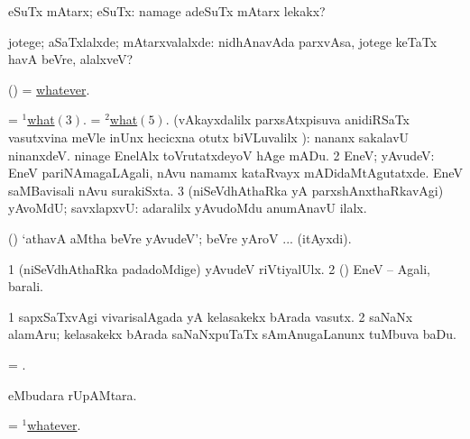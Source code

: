 \bentry
{} 
\gl{\kirxvi}
\expl{}
\bmng
eSuTx mAtarx; eSuTx:  namage adeSuTx mAtarx lekakx? 
\emng

\noindent 
\gl{\pagu}
\expl{}
\bmng
{} jotege; aSaTxlalxde; mAtarxvalalxde:  nidhAnavAda parxvAsa, jotege keTaTx havA beVre, alalxveV? 
\emng
\eentry

\bentry
{} 
\expl{}
\bmng
(\kAparx) = \hyperlink{whatever(1)}{whatever}. 
\emng
\eentry

\bentry
{} 
\expl{}
\bmng
\bnum
{} 
\banum
{} = \hyperlink{what(1)3}{$^1$what\((3)\)}. 
 = \hyperlink{what(2)5}{$^2$what\((5)\)}. (vAkayxdalilx parxsAtxpisuva anidiRSaTx vasutxvina meVle inUnx hecicxna otutx biVLuvalilx \parx):  nananx sakalavU ninanxdeV.  ninage EnelAlx toVrutatxdeyoV hAge mADu. 
\eanum
\numie
\num{2} EneV; yAvudeV:  EneV pariNAmagaLAgali, nAvu namamx kataRvayx mADidaMtAgutatxde.  EneV saMBavisali nAvu surakiSxta. 
\num{3} (niSeVdhAthaRka yA parxshAnxthaRkavAgi) yAvoMdU; savxlapxvU:  adaralilx yAvudoMdu anumAnavU ilalx. 
\enum
\emng

\noindent 
\gl{\pagu}
\expl{}
\bmng
{} (\AmA) `athavA aMtha beVre yAvudeV'; beVre yAroV ... (itAyxdi). 
\emng
\eentry

\bentry
{}
\gl{\kirxvi}
\expl{}
\bmng
\bnum
\num{1} (niSeVdhAthaRka padadoMdige) yAvudeV riVtiyalUlx. 
\num{2} (\anw) EneV -- Agali, barali. 
\enum
\emng
\eentry

\bentry
{} 
\gl{\nA}
\expl{}
\bmng
\bnum
\num{1} sapxSaTxvAgi vivarisalAgada yA kelasakekx bArada vasutx. 
\num{2} saNaNx alamAru; kelasakekx bArada saNaNxpuTaTx sAmAnugaLanunx tuMbuva baDu. 
\enum
\emng
\eentry

\bentry
{} 
\expl{(\pArxparx)}
\bmng
= . 
\emng
\eentry

\bentry
{} 
\expl{(\kAparx)}
\bmng
  eMbudara rUpAMtara. 
\emng
\eentry

\bentry
{} 
\expl{}
\bmng
= \hyperlink{whatever(1)}{$^1$whatever}. 
\emng
\eentry

